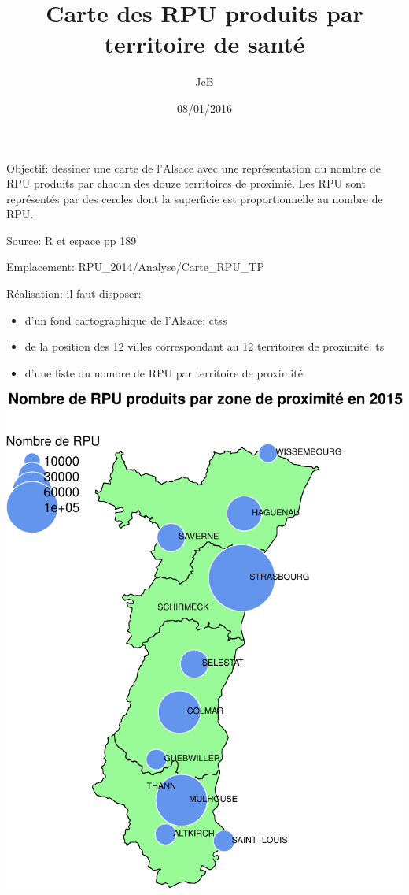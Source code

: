 \documentclass[]{article}
\title{Carte des RPU produits par territoire de santé}
\author{JcB}
\date{08/01/2016}
\begin{document}
\maketitle


Objectif: dessiner une carte de l'Alsace avec une représentation du
nombre de RPU produits par chacun des douze territoires de proximié. Les
RPU sont représentés par des cercles dont la superficie est
proportionnelle au nombre de RPU.

Source: R et espace pp 189

Emplacement: RPU\_2014/Analyse/Carte\_RPU\_TP

Réalisation: il faut disposer:

\begin{itemize}
\itemsep1pt\parskip0pt
\item
  d'un fond cartographique de l'Alsace: ctss
\item
  de la position des 12 villes correspondant au 12 territoires de
  proximité: ts
\item
  d'une liste du nombre de RPU par territoire de proximité
\end{itemize}

\includegraphics{carte_rpu_tp_files/figure-latex/carte-1.pdf}
\end{document}
